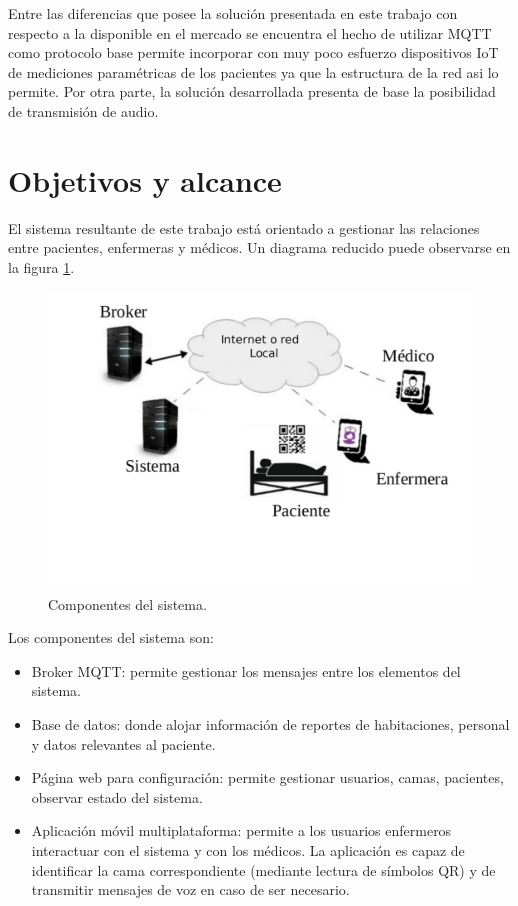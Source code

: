 Entre las diferencias que posee la solución presentada en este trabajo con respecto a la disponible en el mercado se encuentra el hecho de utilizar MQTT como protocolo base permite incorporar con muy poco esfuerzo dispositivos IoT de mediciones paramétricas de los pacientes ya que la estructura de la red asi lo permite. Por otra parte, la solución desarrollada presenta de base la posibilidad de transmisión de audio. 



\section{Objetivos y alcance}

El sistema resultante de este trabajo está orientado a gestionar las relaciones entre pacientes, enfermeras y médicos. Un diagrama reducido puede observarse en la figura \ref{fig:Figura-reducida}.  

\begin{figure}[ht]
	\centering
	\includegraphics[scale=.45]{./Figures/diag-redux.pdf}
	\caption{Componentes del sistema.}
	\label{fig:Figura-reducida}
\end{figure}


Los componentes del sistema son:
\begin{itemize}
\item Broker MQTT: permite gestionar los mensajes entre los elementos del sistema.
\item Base de datos: donde alojar información de reportes de habitaciones, personal y datos relevantes al paciente.
\item Página web para configuración: permite gestionar usuarios, camas, pacientes, observar estado del sistema.
\item Aplicación móvil multiplataforma: permite a los usuarios enfermeros interactuar con el sistema y con los médicos. La aplicación es capaz de identificar la cama correspondiente (mediante lectura de símbolos QR) y de transmitir mensajes de voz en caso de ser necesario.
\end{itemize}

